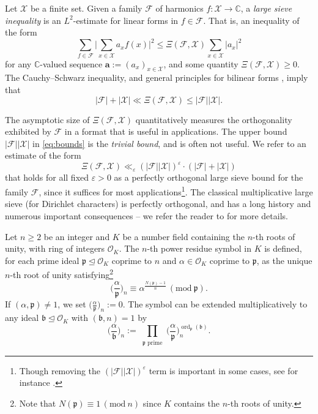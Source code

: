 \documentclass[12pt,reqno]{amsart}
\numberwithin{equation}{section}
\newcommand{\ord}{\operatorname{ord}}
\renewcommand{\pmod}[1]{\, (\mathrm{mod}\ #1)}
\begin{document}
Let $\mathcal{X}$ be a finite set. Given a family $\mathcal{F}$ of harmonics $f: \mathcal{X} \rightarrow \mathbb{C}$,
a \emph{large sieve inequality} is an $L^2$-estimate 
for linear forms in $f \in \mathcal{F}$. That is, an inequality of the form
\begin{equation*}
\sum_{f \in \mathcal{F}} \Big | \sum_{x \in \mathcal{X}} a _x f(x) \Big |^2 \leq \Xi(\mathcal{F},\mathcal{X})  \sum_{x \in \mathcal{X}} |a_x|^2
\end{equation*}
for any $\mathbb{C}$-valued sequence $\boldsymbol{a}:=(a_x)_{x \in \mathcal{X}}$, and some quantity $\Xi(\mathcal{F},\mathcal{X}) \geq 0$.
The Cauchy--Schwarz inequality, and general principles for bilinear forms \cite[\S 7.3]{IK}, imply that
\begin{equation} \label{eq:bounds}
|\mathcal{F}|+|\mathcal{X}| \ll \Xi(\mathcal{F},\mathcal{X}) \leq |\mathcal{F}| |\mathcal{X}|.
\end{equation}

The asymptotic size of $\Xi(\mathcal{F},\mathcal{X})$ quantitatively measures
the orthogonality exhibited by $\mathcal{F}$ in a format that is useful in applications. The upper bound $|\mathcal{F}| |\mathcal{X}|$ in \eqref{eq:bounds} is the \emph{trivial bound}, and is often not useful. We refer to an estimate of the form
\begin{equation} \label{eq:perfect}
    \Xi(\mathcal{F},\mathcal{X}) \ll_\varepsilon (|\mathcal{F}| |\mathcal{X}|)^{\varepsilon} \cdot (|\mathcal{F}|+|\mathcal{X}|)
\end{equation}
that holds for all fixed $\varepsilon > 0$ as a perfectly orthogonal large sieve bound for the family $\mathcal{F}$, since it suffices for most applications\footnote{Though removing the $(|\mathcal{F}| |\mathcal{X}|)^{\varepsilon}$ term is important in some cases, see for instance \cite{Xia24,SS24}.}. The classical multiplicative large sieve (for Dirichlet characters) is perfectly orthogonal, and has a long history and numerous important consequences -- we refer the reader to \cite{Mon71} for more details. 

Let $n \geq 2$ be an integer and $K$ be a number field containing the $n$-th roots of unity, with ring of integers $\mathcal{O}_K$. The $n$-th power residue symbol in $K$ is defined, for each prime ideal $\mathfrak{p} \unlhd \mathcal{O}_K$ coprime to $n$ and $\alpha \in \mathcal{O}_K$ coprime to $\mathfrak{p}$, as the unique $n$-th root of unity satisfying\footnote{Note that $N(\mathfrak{p}) \equiv 1 \pmod{n}$ since $K$ contains the $n$-th roots of unity.}
\begin{equation*}
    \Big(\frac{\alpha}{\mathfrak{p}}\Big)_n \equiv \alpha^{\frac{N(\mathfrak{p})-1}{n}} \pmod{\mathfrak{p}}.
\end{equation*}
If $(\alpha, \mathfrak{p}) \neq 1$, we set $\big(\frac{\alpha}{\mathfrak{p}}\big)_n := 0$. The symbol can be extended multiplicatively to any ideal $\mathfrak{b} \unlhd \mathcal{O}_K$ with $(\mathfrak{b}, n) = 1$ by
\begin{equation*}
     \Big(\frac{\alpha}{\mathfrak{b}}\Big)_n  := \prod_{\substack{\mathfrak{p} \text{ prime}}} \Big(\frac{\alpha}{\mathfrak{p}}\Big)^{\ord_\mathfrak{p}(\mathfrak{b})}_n.
\end{equation*}
\end{document}

